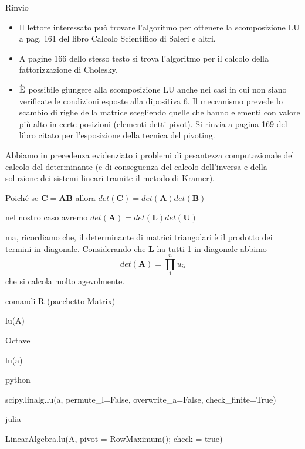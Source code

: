 \begin{frame}{Rinvio}
\label{rinvio}
\begin{itemize}
\item
  Il lettore interessato può trovare l'algoritmo per ottenere la
  scomposizione LU a pag. 161 del libro Calcolo Scientifico di Saleri e
  altri.
\item
  A pagine 166 dello stesso testo si trova l'algoritmo per il calcolo
  della fattorizzazione di Cholesky.
\item
  \(\textnormal{\`E}\) possibile giungere alla scomposizione LU anche
  nei casi in cui non siano verificate le condizioni esposte alla
  dipositiva 6. Il meccanismo prevede lo scambio di righe della matrice
  scegliendo quelle che hanno elementi con valore più alto in certe
  posizioni (elementi detti pivot). Si rinvia a pagina 169 del libro
  citato per l'esposizione della tecnica del pivoting.
\end{itemize}
\end{frame}

\begin{frame}{}
\label{section-1}
Abbiamo in precedenza evidenziato i problemi di pesantezza
computazionale del calcolo del determinante (e di conseguenza del
calcolo dell'inversa e della soluzione dei sistemi lineari tramite il
metodo di Kramer).

\vskip5mm

Poiché se \(\mathbf{C=AB}\) allora
\(det(\mathbf{C})=det(\mathbf{A})det(\mathbf{B})\)

\vskip5mm

nel nostro caso avremo
\(det(\mathbf{A})=det(\mathbf{L})det(\mathbf{U})\)

\vskip5mm

ma, ricordiamo che, il determinante di matrici triangolari è il prodotto
dei termini in diagonale. Considerando che \(\mathbf{L}\) ha tutti 1 in
diagonale abbimo \[det(\mathbf{A})=\prod_1^n u_{ii}\] che si calcola
molto agevolmente.
\end{frame}

\begin{frame}{comandi}
\label{comandi}
R (pacchetto Matrix)

lu(A)

\vskip5mm

Octave

lu(a)

\vskip5mm

python

scipy.linalg.lu(a, permute\_l=False, overwrite\_a=False,
check\_finite=True)

\vskip5mm

julia

LinearAlgebra.lu(A, pivot = RowMaximum(); check = true)
\end{frame}

